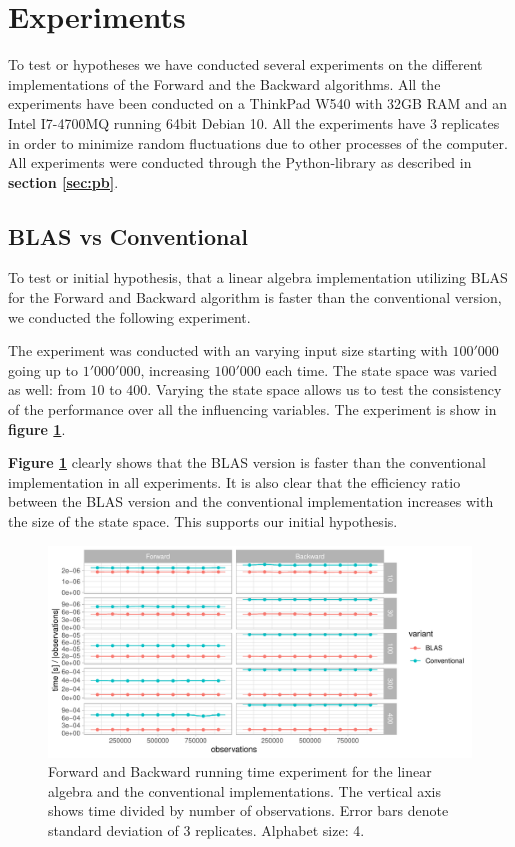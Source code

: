 \section{Experiments}\label{sec:expriments}

To test or hypotheses we have conducted several experiments on the different implementations of the Forward and the Backward algorithms. All the experiments have been conducted on a ThinkPad W540 with 32GB RAM and an Intel I7-4700MQ running 64bit Debian 10. All the experiments have 3 replicates in order to minimize random fluctuations due to other processes of the computer.
All experiments were conducted through the Python-library as described in \textbf{section \ref{sec:pb}}.

\subsection{BLAS vs Conventional}\label{sec:A1}
To test or initial hypothesis, that a linear algebra implementation utilizing BLAS for the Forward and Backward algorithm is faster than the conventional version, we conducted the following experiment.

The experiment was conducted with an varying input size starting with $100'000$ going up to $1'000'000$, increasing $100'000$ each time. The state space was varied as well: from $10$ to $400$. Varying the state space allows us to test the consistency of the performance over all the influencing variables. The experiment is show in \textbf{figure \ref{fig:A1}}. 

\textbf{Figure \ref{fig:A1}} clearly shows that the BLAS version is faster than the conventional implementation in all experiments. It is also clear that the efficiency ratio between the BLAS version and the conventional implementation increases with the size of the state space. This supports our initial hypothesis. 

\begin{figure}[H]
  \centering
  \includegraphics[scale=0.85]{figures/figure_A1.pdf}
  \caption{\small{Forward and Backward running time experiment for the linear algebra and the conventional implementations. The vertical axis shows time divided by number of observations. Error bars denote standard deviation of 3 replicates. Alphabet size: 4.}}
  \label{fig:A1}
\end{figure}

